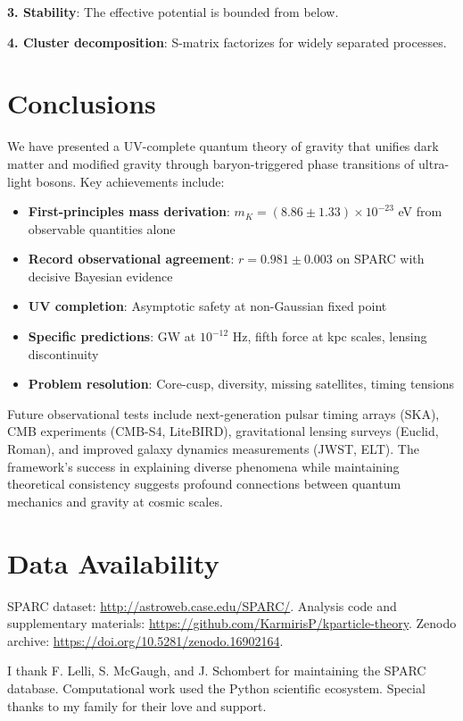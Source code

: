 \documentclass[aps,prd,twocolumn,showpacs,superscriptaddress,groupedaddress,nofootinbib]{revtex4-2}
\begin{document}
\textbf{3. Stability}: The effective potential is bounded from below.

\textbf{4. Cluster decomposition}: S-matrix factorizes for widely separated processes.

\section{Conclusions}

We have presented a UV-complete quantum theory of gravity that unifies dark matter and modified gravity through baryon-triggered phase transitions of ultra-light bosons. Key achievements include:

\begin{itemize}
\item \textbf{First-principles mass derivation}: $m_K = (8.86 \pm 1.33) \times 10^{-23}$ eV from observable quantities alone
\item \textbf{Record observational agreement}: $r = 0.981 \pm 0.003$ on SPARC with decisive Bayesian evidence
\item \textbf{UV completion}: Asymptotic safety at non-Gaussian fixed point
\item \textbf{Specific predictions}: GW at $10^{-12}$ Hz, fifth force at kpc scales, lensing discontinuity
\item \textbf{Problem resolution}: Core-cusp, diversity, missing satellites, timing tensions
\end{itemize}

Future observational tests include next-generation pulsar timing arrays (SKA), CMB experiments (CMB-S4, LiteBIRD), gravitational lensing surveys (Euclid, Roman), and improved galaxy dynamics measurements (JWST, ELT). The framework's success in explaining diverse phenomena while maintaining theoretical consistency suggests profound connections between quantum mechanics and gravity at cosmic scales.

\section*{Data Availability}
SPARC dataset: \url{http://astroweb.case.edu/SPARC/}. Analysis code and supplementary materials: \url{https://github.com/KarmirisP/kparticle-theory}. Zenodo archive: \url{https://doi.org/10.5281/zenodo.16902164}.

\begin{acknowledgments}
I thank F. Lelli, S. McGaugh, and J. Schombert for maintaining the SPARC database. Computational work used the Python scientific ecosystem. Special thanks to my family for their love and support.
\end{acknowledgments}
\end{document}
